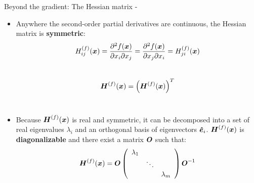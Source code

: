 \begin{frame}[t,allowframebreaks]{
    Beyond the gradient: The Hessian matrix -}
    \framebreak


    \begin{itemize}
        \item 
        Anywhere the second-order partial derivatives are continuous,
        the \gls{Hessian matrix} is {\bf symmetric}:
        \begin{equation}
            H^{(f)}_{ij}(\boldsymbol{x}) = 
              \frac{\partial^2 f(\boldsymbol{x})}{\partial x_i \partial x_j} =
              \frac{\partial^2 f(\boldsymbol{x})}{\partial x_j \partial x_i} =
              H^{(f)}_{ji}(\boldsymbol{x}) 
            \label{eq:hessian_symmetric_1}
         \end{equation}\\
         \begin{equation}
              \boldsymbol{H}^{(f)}(\boldsymbol{x}) = \Big( \boldsymbol{H}^{(f)}(\boldsymbol{x}) \Big)^T
            \label{eq:hessian_symmetric_2}
         \end{equation}\\
    
        \item 
        Because $\boldsymbol{H}^{(f)}(\boldsymbol{x})$ is real and symmetric,
        it can be decomposed into a set of real 
        \glspl{eigenvalue} $\lambda_{i}$
        and an orthogonal basis of 
        \glspl{eigenvector} $\boldsymbol{\hat{e}}_i$.
        $\boldsymbol{H}^{(f)}(\boldsymbol{x})$ is {\bf diagonalizable} and
        there exist a matrix $\boldsymbol{O}$ such that:
        \begin{equation}
            \boldsymbol{H}^{(f)}(\boldsymbol{x}) = 
            \boldsymbol{O}
            \left(
                \begin{array}{ccc}
                    \lambda_1 &        & \\
                              & \ddots & \\
                              &        & \lambda_m \\                              
                \end{array}
            \right)
            \boldsymbol{O}^{-1}
          \label{eq:hessian_diag_1}
       \end{equation}\\
    \end{itemize}

    \framebreak



\end{frame}
